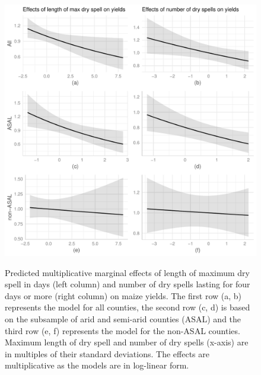 \documentclass[12pt]{iopart}
\begin{document}
  \begin{figure}
   \includegraphics{Figure3a_3f.pdf}\label{MarEff3}
\caption{Predicted multiplicative marginal effects of length of maximum dry spell in days (left column) and number of dry spells lasting for four days or more (right column) on maize yields. The first row (a, b) represents the model for all counties, the second row (c, d) is based on the subsample of arid and semi-arid counties (ASAL) and the third row (e, f) represents the model for the non-ASAL counties. Maximum length of dry spell and number of dry spells (x-axis) are in multiples of their standard deviations. The effects are multiplicative as the models are in log-linear form.}
\end{figure}
\end{document}

